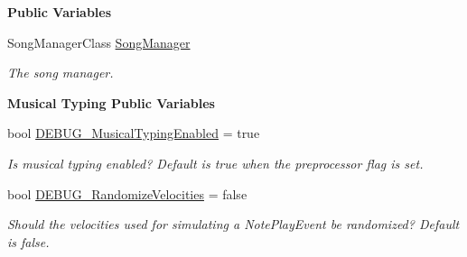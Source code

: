 \begin{Indent}\textbf{ Public Variables}\par
\begin{DoxyCompactItemize}
\item 
Song\+Manager\+Class \hyperlink{group___virtual_instrument_manager_a33dae94932c10c66db76a0eebec76b01}{Song\+Manager}
\begin{DoxyCompactList}\small\item\em The song manager. \end{DoxyCompactList}\end{DoxyCompactItemize}
\end{Indent}
\begin{Indent}\textbf{ Musical Typing Public Variables}\par
\begin{DoxyCompactItemize}
\item 
bool \hyperlink{group___audio_testing_ga89a9071345f0b3c3c3496e0959e6627b}{D\+E\+B\+U\+G\+\_\+\+Musical\+Typing\+Enabled} = true
\begin{DoxyCompactList}\small\item\em Is musical typing enabled? Default is true when the preprocessor flag is set. \end{DoxyCompactList}\item 
bool \hyperlink{group___audio_testing_ga96506a2d62073319d65380f86ff0d5bb}{D\+E\+B\+U\+G\+\_\+\+Randomize\+Velocities} = false
\begin{DoxyCompactList}\small\item\em Should the velocities used for simulating a Note\+Play\+Event be randomized? Default is false. \end{DoxyCompactList}\end{DoxyCompactItemize}
\end{Indent}
